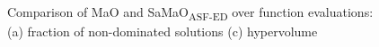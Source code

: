 \documentclass[twocolumn,10pt]{asme2ej}
\begin{document}
\begin{figure}[!htb]
	\centering    
	\\
	\caption{Comparison of MaO and SaMaO\textsubscript{ASF-ED} over function evaluations: (a) fraction of non-dominated solutions (c) hypervolume}
	\label{fig:ndhv}
\end{figure}
\end{document}
